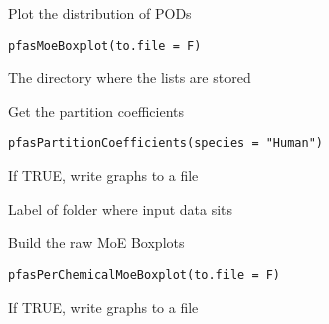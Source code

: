 \documentclass[letterpaper]{book}
\begin{document}
%
\begin{Description}\relax
Plot the distribution of PODs
\end{Description}
%
\begin{Usage}
\begin{verbatim}
pfasMoeBoxplot(to.file = F)
\end{verbatim}
\end{Usage}
%
\begin{Arguments}
\begin{ldescription}
\item[\code{dir}] The directory where the lists are stored
\end{ldescription}
\end{Arguments}
%
\begin{Description}\relax
Get the partition coefficients
\end{Description}
%
\begin{Usage}
\begin{verbatim}
pfasPartitionCoefficients(species = "Human")
\end{verbatim}
\end{Usage}
%
\begin{Arguments}
\begin{ldescription}
\item[\code{to.file}] If TRUE, write graphs to a file

\item[\code{data.version}] Label of folder where input data sits
\end{ldescription}
\end{Arguments}
%
\begin{Description}\relax
Build the raw MoE Boxplots
\end{Description}
%
\begin{Usage}
\begin{verbatim}
pfasPerChemicalMoeBoxplot(to.file = F)
\end{verbatim}
\end{Usage}
%
\begin{Arguments}
\begin{ldescription}
\item[\code{to.file}] If TRUE, write graphs to a file
\end{ldescription}
\end{Arguments}
\end{document}
